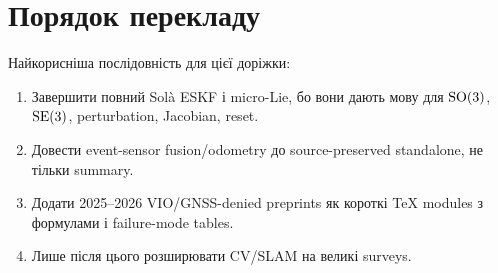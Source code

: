 \section*{Порядок перекладу}

Найкорисніша послідовність для цієї доріжки:
\begin{enumerate}[leftmargin=2em]
\item Завершити повний Solà ESKF і micro-Lie, бо вони дають мову для $\mathrm{SO}(3)$, $\mathrm{SE}(3)$, perturbation, Jacobian, reset.
\item Довести event-sensor fusion/odometry до source-preserved standalone, не тільки summary.
\item Додати 2025--2026 VIO/GNSS-denied preprints як короткі TeX modules з формулами і failure-mode tables.
\item Лише після цього розширювати CV/SLAM на великі surveys.
\end{enumerate}
